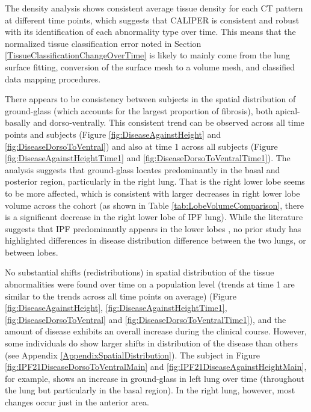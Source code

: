 The density analysis shows consistent average tissue density for each CT pattern at different time points, which suggests that CALIPER is consistent and robust with its identification of each abnormality type over time. This means that the normalized tissue classification error noted in Section \ref{TissueClassificationChangeOverTime} is likely to mainly come from the lung surface fitting, conversion of the surface mesh to a volume mesh, and classified data mapping procedures.

There appears to be consistency between subjects in the spatial distribution of ground-glass (which accounts for the largest proportion of fibrosis), both apical-basally and dorso-ventrally. This consistent trend can be observed across all time points and subjects (Figure \ref{fig:DiseaseAgainstHeight} and \ref{fig:DiseaseDorsoToVentral}) and also at time 1 across all subjects (Figure \ref{fig:DiseaseAgainstHeightTime1} and \ref{fig:DiseaseDorsoToVentralTime1}). The analysis suggests that ground-glass locates predominantly in the basal and posterior region, particularly in the right lung. That is the right lower lobe seems to be more affected, which is consistent with larger decreases in right lower lobe volume across the cohort (as shown in Table \ref{tab:LobeVolumeComparison}, there is a significant decrease in the right lower lobe of IPF lung). While the literature suggests that IPF predominantly appears in the lower lobes \citep{king2011idiopathic,raghu2011official,richeldi2017idiopathic}, no prior study has highlighted differences in disease distribution difference between the two lungs, or between lobes.

No substantial shifts (redistributions) in spatial distribution of the tissue abnormalities were found over time on a population level (trends at time 1 are similar to the trends across all time points on average) (Figure \ref{fig:DiseaseAgainstHeight}, \ref{fig:DiseaseAgainstHeightTime1}, \ref{fig:DiseaseDorsoToVentral} and \ref{fig:DiseaseDorsoToVentralTime1}), and the amount of disease exhibits an overall increase during the clinical course. However, some individuals do show larger shifts in distribution of the disease than others (see Appendix \ref{AppendixSpatialDistribution}). The subject in Figure \ref{fig:IPF21DiseaseDorsoToVentralMain} and \ref{fig:IPF21DiseaseAgainstHeightMain}, for example, shows an increase in ground-glass in left lung over time (throughout the lung but particularly in the basal region). In the right lung, however, most changes occur just in the anterior area.

